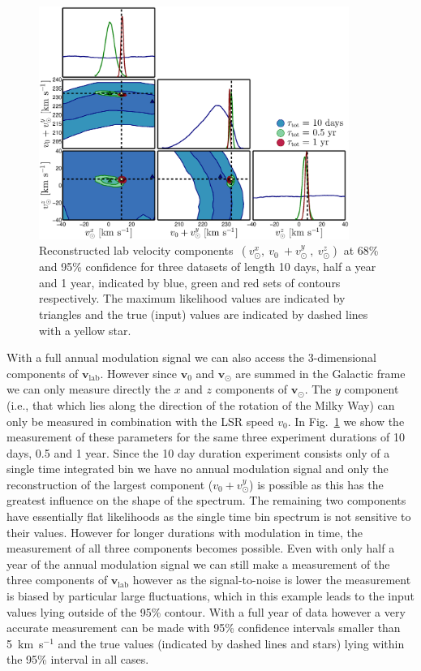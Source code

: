 \begin{figure}
\begin{center}
	\includegraphics[width=0.9\textwidth]{Figures/vpec_reconstruction.eps}
    \caption[Reconstructed lab velocity components]{Reconstructed lab velocity components~$(v_\odot^x,~v_{0}~+v_\odot^y~,~v_\odot^z)$  at 68\% and 95\% confidence for three datasets of length 10 days, half a year and 1 year, indicated by blue, green and red sets of contours respectively. The maximum likelihood values are indicated by triangles and the true (input) values are indicated by dashed lines with a yellow star.}\label{fig:vpec_reconstruction}
\end{center}
\end{figure}
With a full annual modulation signal we can also access the 3-dimensional components of $\textbf{v}_\textrm{lab}$. However since $\textbf{v}_0$ and $\textbf{v}_\odot$ are summed in the Galactic frame we can only measure directly the $x$ and $z$ components of $\textbf{v}_\odot$. The $y$ component (i.e., that which lies along the direction of the rotation of the Milky Way) can only be measured in combination with the LSR speed $v_0$. In Fig.~\ref{fig:vpec_reconstruction} we show the measurement of these parameters for the same three experiment durations of 10 days, 0.5 and 1 year. Since the 10 day duration experiment consists only of a single time integrated bin we have no annual modulation signal and only the reconstruction of the largest component ($v_0+v^y_\odot$) is possible as this has the greatest influence on the shape of the spectrum. The remaining two components have essentially flat likelihoods as the single time bin spectrum is not sensitive to their values. However for longer durations with modulation in time, the measurement of all three components becomes possible. Even with only half a year of the annual modulation signal we can still make a measurement of the three components of $\textbf{v}_\textrm{lab}$ however as the signal-to-noise is lower the measurement is biased by particular large fluctuations, which in this example leads to the input values lying outside of the 95\% contour. With a full year of data however a very accurate measurement can be made with 95\% confidence intervals smaller than 5~km~s$^{-1}$ and the true values (indicated by dashed lines and stars) lying within the 95\% interval in all cases.

